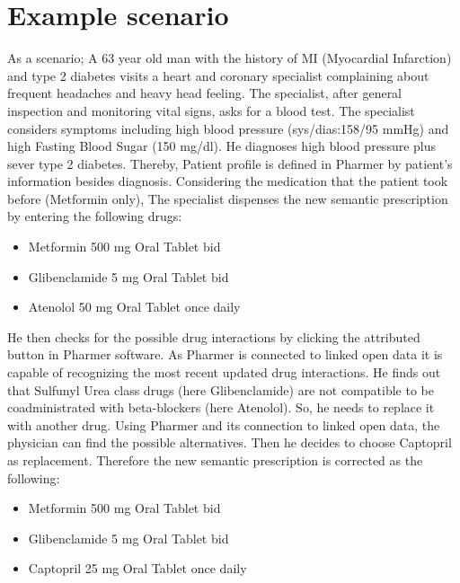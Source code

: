 \documentclass[10pt, conference, compsocconf]{IEEEtran}
\begin{document}
\section{Example scenario}
\label{sec:example}
As a scenario; A 63 year old man with the history of MI (Myocardial Infarction) and type 2 diabetes visits a heart and coronary specialist complaining about frequent headaches and heavy head feeling. The specialist, after general inspection and monitoring vital signs, asks for a blood test. The specialist considers symptoms including high blood pressure (sys/dias:158/95 mmHg) and high Fasting Blood Sugar (150 mg/dl). He diagnoses high blood pressure plus sever type 2 diabetes.
Thereby, Patient profile is defined in Pharmer by patient's information besides diagnosis.
Considering the medication that the patient took before (Metformin only), The specialist dispenses the new semantic prescription by entering the following drugs:

\begin{itemize}
\item {Metformin} 500 mg Oral Tablet bid
\item {Glibenclamide} 5 mg Oral Tablet bid
\item {Atenolol} 50 mg Oral Tablet once daily
\end{itemize}

He then checks for the possible drug interactions by clicking the attributed button in Pharmer software.
As Pharmer is connected to linked open data it is capable of recognizing the most recent updated drug interactions.
He finds out that Sulfunyl Urea class drugs (here Glibenclamide) are not compatible to be coadministrated with beta-blockers (here Atenolol).
So, he needs to replace it with another drug.
Using Pharmer and its connection to linked open data, the physician can find the possible alternatives.
Then he decides to choose Captopril as replacement.
Therefore the new semantic prescription is corrected as the following:

\begin{itemize}
\item {Metformin} 500 mg Oral Tablet bid
\item {Glibenclamide} 5 mg Oral Tablet bid
\item {Captopril} 25 mg Oral Tablet once daily
\end{itemize}
\end{document}
